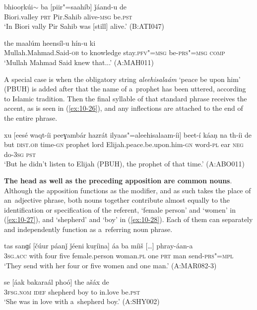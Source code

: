 \begin{exe}
\ex
\label{ex:10-24}
\gll bhiooṛkúi$\sim$ ba [piir"=saahíb] ǰáand-u de \\
Biori.valley \textsc{prt} Pir.Sahib alive-\textsc{msg} be.\textsc{pst} \\
\glt `In Biori vally Pir Sahib was [still] alive.' (B:ATI047)

\ex
\label{ex:10-25}
\gll [mulaa"=mhaamad"=seed-á] the maalúm heensíl-u hín-u ki \\
Mullah.Mahmad.Said-\textsc{ob} to knowledge stay.\textsc{pfv"=msg} be-\textsc{prs"=msg} \textsc{comp} \\
\glt `Mullah Mahmad Said knew that...' (A:MAH011)
\end{exe}

A special case is when the obligatory string \textit{aleehisalaám} `peace be upon him' (PBUH) is added after that the name of a~prophet has been uttered, according to Islamic tradition. Then the final syllable of that standard phrase receives the accent, as is seen in (\ref{ex:10-26}), and any inflections are attached to the end of the entire phrase.

\begin{exe}
\ex
\label{ex:10-26}
\gll xu [eesé waqt-íi peeɣambár hazrát ilyaas"=aleehisalaam-íi] beet-í káaṇ na th-íi de \\
but \textsc{dist.ob} time-\textsc{gn} prophet lord  Elijah.peace.be.upon.him-\textsc{gn} 
word-\textsc{pl} ear \textsc{neg} do-\textsc{3sg} \textsc{pst} \\
\glt `But he didn't listen to Elijah (PBUH), the prophet of that time.' (A:ABO011)
\end{exe}

\textbf{The head as well as the preceding apposition are common nouns}. Although the apposition functions as the modifier, and as such takes the place of an~adjective phrase, both nouns together contribute almost equally to the identification or specification of the referent, `female person' and `women' in (\ref{ex:10-27}), and `shepherd' and `boy' in (\ref{ex:10-28}). Each of them can separately and independently function as a~referring noun phrase. 

\begin{exe}
\ex
\label{ex:10-27}
\gll tas sanɡí [čúur páanǰ ǰéeni kuṛíina] áa ba míiš [{\ldots}] phray-áan-a \\
\textsc{3sg.acc} with four five female.person woman.\textsc{pl}  one \textsc{prt} man {} send-\textsc{prs"=mpl} \\
\glt `They send with her four or five women and one man.' (A:MAR082-3)

\ex
\label{ex:10-28}
\gll se [áak bakaraál phoó] the ašáx de  \\
\textsc{3fsg.nom} \textsc{idef} shepherd boy to in.love be.\textsc{pst}  \\
\glt `She was in love with a~shepherd boy.' (A:SHY002)
\end{exe}


